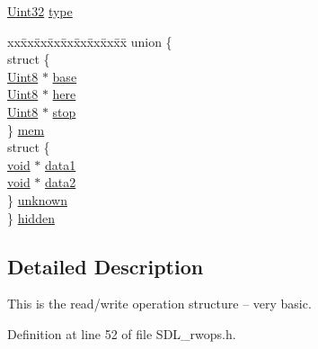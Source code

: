 \begin{DoxyCompactItemize}
\item 
\mbox{\hyperlink{_s_d_l__stdinc_8h_add440eff171ea5f55cb00c4a9ab8672d}{Uint32}} \mbox{\hyperlink{struct_s_d_l___r_wops_a099017bfceaac24ced0e4d08a4e0a023}{type}}
\item 
\begin{tabbing}
xx\=xx\=xx\=xx\=xx\=xx\=xx\=xx\=xx\=\kill
union \{\\
\>struct \{\\
\>\>\mbox{\hyperlink{_s_d_l__stdinc_8h_a2944638813a090aa23e62f4da842c3e2}{Uint8}} $\ast$ \mbox{\hyperlink{struct_s_d_l___r_wops_af9b489d7342296ce197b911cfa93b2ab}{base}}\\
\>\>\mbox{\hyperlink{_s_d_l__stdinc_8h_a2944638813a090aa23e62f4da842c3e2}{Uint8}} $\ast$ \mbox{\hyperlink{struct_s_d_l___r_wops_a6fc84601c17e347c6ef24c63a79deb57}{here}}\\
\>\>\mbox{\hyperlink{_s_d_l__stdinc_8h_a2944638813a090aa23e62f4da842c3e2}{Uint8}} $\ast$ \mbox{\hyperlink{struct_s_d_l___r_wops_a4108a41afa8b62e75b0f160de4b56103}{stop}}\\
\>\} \mbox{\hyperlink{struct_s_d_l___r_wops_a830ef39b29712325ee60d2c09190fdfe}{mem}}\\
\>struct \{\\
\>\>\mbox{\hyperlink{_s_d_l__opengles2__gl2ext_8h_ae5d8fa23ad07c48bb609509eae494c95}{void}} $\ast$ \mbox{\hyperlink{struct_s_d_l___r_wops_ab89d27b4312c0b9d664c81bc92917fc8}{data1}}\\
\>\>\mbox{\hyperlink{_s_d_l__opengles2__gl2ext_8h_ae5d8fa23ad07c48bb609509eae494c95}{void}} $\ast$ \mbox{\hyperlink{struct_s_d_l___r_wops_aca073130e2e262eb11e86e1be993e215}{data2}}\\
\>\} \mbox{\hyperlink{struct_s_d_l___r_wops_a5c2ef3288fcf78cc28f1b4b16b32eca1}{unknown}}\\
\} \mbox{\hyperlink{struct_s_d_l___r_wops_a2bf0dec0395f771b30c841fc7296164b}{hidden}}\\

\end{tabbing}\end{DoxyCompactItemize}


\subsection{Detailed Description}
This is the read/write operation structure -- very basic. 

Definition at line 52 of file S\+D\+L\+\_\+rwops.\+h.




